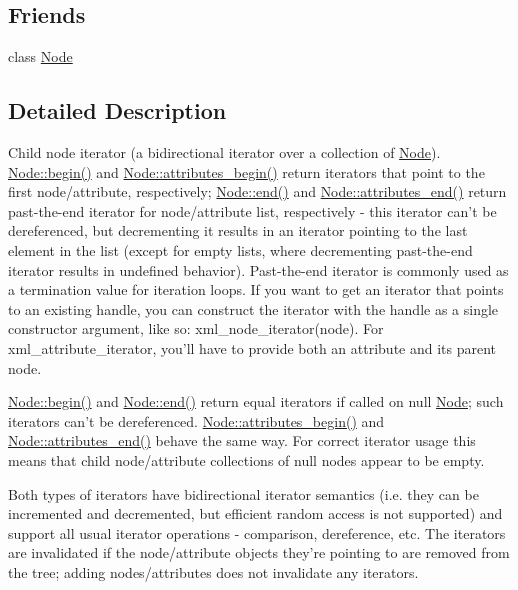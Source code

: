 \subsection*{Friends}
\begin{DoxyCompactItemize}
\item 
\hypertarget{classphys_1_1xml_1_1NodeIterator_a6db9d28bd448a131448276ee03de1e6d}{
class \hyperlink{classphys_1_1xml_1_1NodeIterator_a6db9d28bd448a131448276ee03de1e6d}{Node}}
\label{da/d4f/classphys_1_1xml_1_1NodeIterator_a6db9d28bd448a131448276ee03de1e6d}

\end{DoxyCompactItemize}


\subsection{Detailed Description}
Child node iterator (a bidirectional iterator over a collection of \hyperlink{classphys_1_1xml_1_1Node}{Node}). \hyperlink{classphys_1_1xml_1_1Node_aa1d7f3762ce58039335368f4c7904bd8}{Node::begin()} and \hyperlink{classphys_1_1xml_1_1Node_a3fa2c9f1bd1d7a7c1d27694388262ef3}{Node::attributes\_\-begin()} return iterators that point to the first node/attribute, respectively; \hyperlink{classphys_1_1xml_1_1Node_affd7c99f2ec8cd7f2f5850a6506f7cf7}{Node::end()} and \hyperlink{classphys_1_1xml_1_1Node_abcf49cbd11c79ff170592aec7c9ccca7}{Node::attributes\_\-end()} return past-\/the-\/end iterator for node/attribute list, respectively -\/ this iterator can't be dereferenced, but decrementing it results in an iterator pointing to the last element in the list (except for empty lists, where decrementing past-\/the-\/end iterator results in undefined behavior). Past-\/the-\/end iterator is commonly used as a termination value for iteration loops. If you want to get an iterator that points to an existing handle, you can construct the iterator with the handle as a single constructor argument, like so: xml\_\-node\_\-iterator(node). For xml\_\-attribute\_\-iterator, you'll have to provide both an attribute and its parent node.\par
\par
 \hyperlink{classphys_1_1xml_1_1Node_aa1d7f3762ce58039335368f4c7904bd8}{Node::begin()} and \hyperlink{classphys_1_1xml_1_1Node_affd7c99f2ec8cd7f2f5850a6506f7cf7}{Node::end()} return equal iterators if called on null \hyperlink{classphys_1_1xml_1_1Node}{Node}; such iterators can't be dereferenced. \hyperlink{classphys_1_1xml_1_1Node_a3fa2c9f1bd1d7a7c1d27694388262ef3}{Node::attributes\_\-begin()} and \hyperlink{classphys_1_1xml_1_1Node_abcf49cbd11c79ff170592aec7c9ccca7}{Node::attributes\_\-end()} behave the same way. For correct iterator usage this means that child node/attribute collections of null nodes appear to be empty.\par
\par
 Both types of iterators have bidirectional iterator semantics (i.e. they can be incremented and decremented, but efficient random access is not supported) and support all usual iterator operations -\/ comparison, dereference, etc. The iterators are invalidated if the node/attribute objects they're pointing to are removed from the tree; adding nodes/attributes does not invalidate any iterators. 

